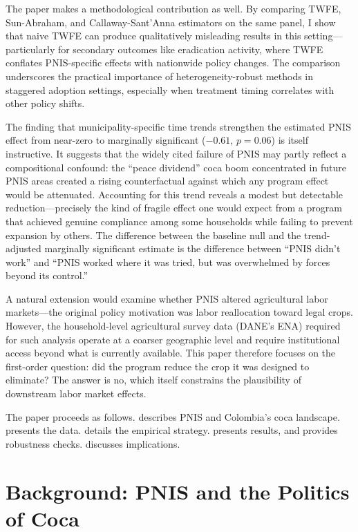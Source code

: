 \documentclass[12pt]{article}
\begin{document}
The paper makes a methodological contribution as well. By comparing TWFE, Sun-Abraham, and Callaway-Sant'Anna estimators on the same panel, I show that naive TWFE can produce qualitatively misleading results in this setting---particularly for secondary outcomes like eradication activity, where TWFE conflates PNIS-specific effects with nationwide policy changes. The comparison underscores the practical importance of heterogeneity-robust methods in staggered adoption settings, especially when treatment timing correlates with other policy shifts.

The finding that municipality-specific time trends strengthen the estimated PNIS effect from near-zero to marginally significant ($-0.61$, $p = 0.06$) is itself instructive. It suggests that the widely cited failure of PNIS may partly reflect a compositional confound: the ``peace dividend'' coca boom concentrated in future PNIS areas created a rising counterfactual against which any program effect would be attenuated. Accounting for this trend reveals a modest but detectable reduction---precisely the kind of fragile effect one would expect from a program that achieved genuine compliance among some households while failing to prevent expansion by others. The difference between the baseline null and the trend-adjusted marginally significant estimate is the difference between ``PNIS didn't work'' and ``PNIS worked where it was tried, but was overwhelmed by forces beyond its control.''

A natural extension would examine whether PNIS altered agricultural labor markets---the original policy motivation was labor reallocation toward legal crops. However, the household-level agricultural survey data (DANE's ENA) required for such analysis operate at a coarser geographic level and require institutional access beyond what is currently available. This paper therefore focuses on the first-order question: did the program reduce the crop it was designed to eliminate? The answer is no, which itself constrains the plausibility of downstream labor market effects.

The paper proceeds as follows.  describes PNIS and Colombia's coca landscape.  presents the data.  details the empirical strategy.  presents results, and  provides robustness checks.  discusses implications.

\section{Background: PNIS and the Politics of Coca} \label{sec:background}
\end{document}
